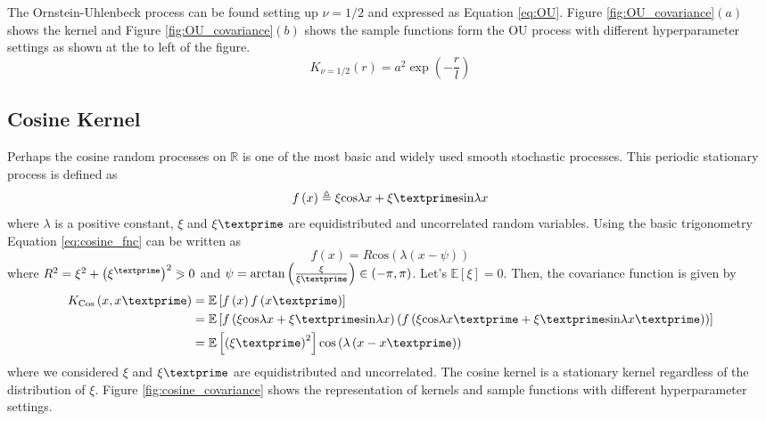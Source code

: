 The Ornstein-Uhlenbeck process can be found setting up $\nu=1/2$ and expressed as Equation \ref{eq:OU}. Figure \ref{fig:OU_covariance}$(a)$ shows the kernel and Figure \ref{fig:OU_covariance}$(b)$ shows the sample functions form the OU process  with different hyperparameter settings as shown at the to left of the figure.  
\begin{equation} \label{eq:OU}
K_{\nu=1/2}(r)= a^2 \exp \left(-\frac{r}{l} \right)
\end{equation}

\subsection{Cosine Kernel}
Perhaps the cosine random processes on $\mathbb{R}$ is one of the most  basic and widely used smooth stochastic processes. This periodic stationary process is defined as
\begin{equation} \label{eq:cosine_fnc}
f\left(x\right) \triangleq \xi\text{cos}\lambda x+ \xi\textprime \text{sin}\lambda x  
\end{equation}
where $\lambda$ is a positive constant, $\xi$ and $\xi\textprime$ are equidistributed and uncorrelated random variables. Using the basic trigonometry Equation \ref{eq:cosine_fnc} can be written as
\begin{equation} \label{eq:cosine_fnc2}
f\left(x\right) = R \text{cos}\left(\lambda\left(x-\psi\right)\right) 
\end{equation}
where $R^2=\xi^2+\left(\xi^\textprime\right)^2\eqslantgtr 0$ and $\psi=\text{arctan}\left(\frac{\xi}{\xi\textprime}\right) \in \left(-\pi,\pi \right)$. Let's $\mathbb{E}\left[\xi\right]=0$. Then, the covariance function is given by
\begin{equation*} \label{eq:cosine_cov}
\begin{split}
K_{\text{Cos}}\left(x,x\textprime\right) 
    &= \mathbb{E}\left[f\left(x\right)f\left(x\textprime\right)\right]\\
    &= \mathbb{E}\left[f\left(\xi\text{cos}\lambda x+ \xi\textprime \text{sin}\lambda x\right)\left(f\left(\xi\text{cos}\lambda x\textprime+ \xi\textprime \text{sin}\lambda x\textprime\right)\right)\right]\\
    &= \mathbb{E}\left[\left(\xi\textprime\right)^2\right]\text{cos}\left(\lambda\left(x-x\textprime\right)\right)\\
\end{split}
\end{equation*}
where we considered  $\xi$ and $\xi\textprime$ are equidistributed and uncorrelated. The cosine kernel is a stationary kernel regardless of the distribution of $\xi$. Figure \ref{fig:cosine_covariance} shows the representation of kernels and sample functions with different hyperparameter settings.

